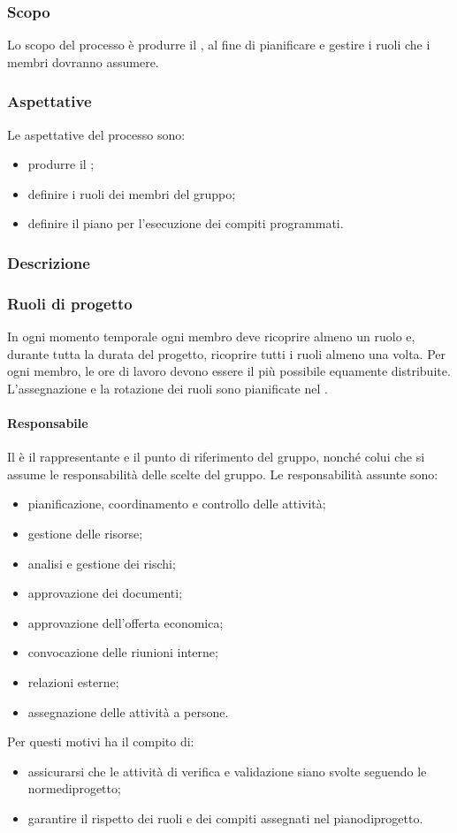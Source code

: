 \subsubsection{Scopo}
Lo scopo del processo è produrre il \PPdoc , al fine di pianificare e gestire i ruoli che i membri dovranno assumere.
\subsubsection{Aspettative}
Le aspettative del processo sono:
 \begin{itemize}
  \item produrre il \PPdoc ;
  \item definire i ruoli dei membri del gruppo;
  \item definire il piano per l'esecuzione dei compiti programmati.
 \end{itemize}
\subsubsection{Descrizione}
 
\subsubsection{Ruoli di progetto}
 In ogni momento temporale ogni membro deve ricoprire almeno un ruolo e, durante tutta la durata del progetto, ricoprire tutti i ruoli almeno una volta. Per ogni membro, le ore di lavoro devono essere il più possibile equamente distribuite. L'assegnazione e la rotazione dei ruoli sono pianificate nel \PPdocRR.
 \paragraph{Responsabile}
 Il \RESP{} è il rappresentante e il punto di riferimento del gruppo, nonché colui che si assume le responsabilità delle scelte del gruppo.
 Le responsabilità assunte sono:
 \begin{itemize}
  \item pianificazione, coordinamento e controllo delle attività;
  \item gestione delle risorse;
  \item analisi e gestione dei rischi;
  \item approvazione dei documenti;
  \item approvazione dell'offerta economica;
  \item convocazione delle riunioni interne;
  \item relazioni esterne;
  \item assegnazione delle attività a persone.
\end{itemize}
Per questi motivi ha il compito di:
\begin{itemize}
	\item assicurarsi che le attività di verifica e validazione siano svolte seguendo le normediprogetto;
	\item garantire il rispetto dei ruoli e dei compiti assegnati nel pianodiprogetto.
\end{itemize}
